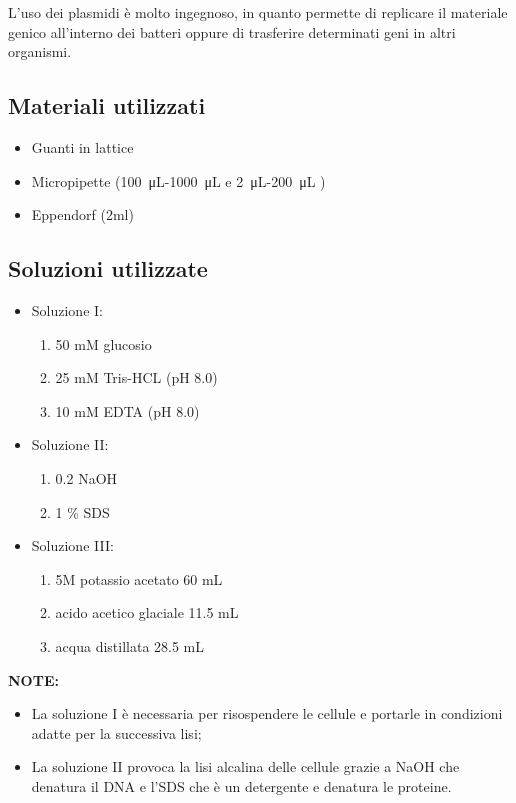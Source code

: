 L'uso dei plasmidi è molto ingegnoso, in quanto permette di replicare il materiale genico all'interno dei batteri
oppure di trasferire determinati geni in altri organismi.


\subsection{Materiali utilizzati}

\begin{itemize}
	\item Guanti in lattice
	\item Micropipette (\SI{100}{\micro\liter}-\SI{1000}{\micro\liter} e \SI{2}{\micro\liter}-\SI{200}{\micro\liter}  )
	\item Eppendorf (2ml)
\end{itemize}


\subsection{Soluzioni utilizzate}

\begin{itemize}

	\item Soluzione I:
  \begin{enumerate}
    \item 50 mM glucosio
    \item 25 mM Tris-HCL (pH 8.0)
    \item 10 mM EDTA (pH 8.0)
  \end{enumerate}
	\item Soluzione II:
  \begin{enumerate}
    \item 0.2 NaOH
    \item 1 \% SDS
  \end{enumerate}
	\item Soluzione III:
  \begin{enumerate}
    \item 5M potassio acetato 60 mL
    \item acido acetico glaciale 11.5 mL
    \item acqua distillata 28.5 mL
  \end{enumerate}

\end{itemize}

\vspace{0.5cm}

\textbf{NOTE:}
\begin{itemize}
  \item La soluzione I è necessaria per risospendere le cellule e portarle in condizioni
	adatte per la successiva lisi;
  \item La soluzione II provoca la lisi alcalina delle cellule grazie a NaOH che denatura
	il DNA e l’SDS che è un detergente e denatura le proteine.
\end{itemize}


